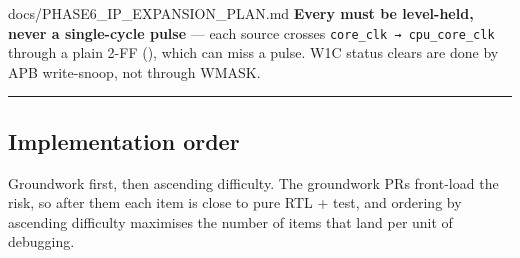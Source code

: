 \begin{relocated}{docs/PHASE6_IP_EXPANSION_PLAN.md}
\textbf{Every  must be level-held, never a single-cycle
pulse} --- each source crosses
\texttt{core\_\allowbreak{}clk\ →\ cpu\_\allowbreak{}core\_\allowbreak{}clk}
through a plain 2-FF  (),
which can miss a pulse. W1C status clears are done by APB write-snoop,
not through WMASK.

\begin{center}\rule{0.5\linewidth}{0.5pt}\end{center}

\subsection{Implementation order}\label{ds:ch:phase6-ip-expansion-plan:6-implementation-order}

Groundwork first, then ascending difficulty. The groundwork PRs
front-load the risk, so after them each item is close to pure RTL +
test, and ordering by ascending difficulty maximises the number of items
that land per unit of debugging.

{\small\setlength{\tabcolsep}{4pt}

}
\end{relocated}

